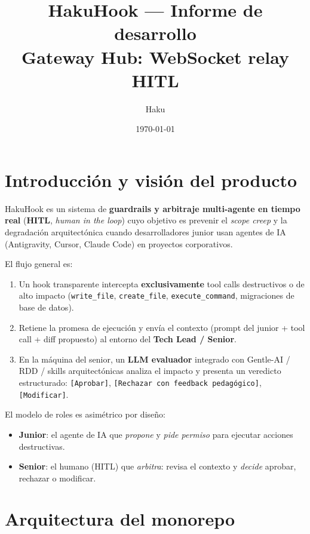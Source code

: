 \documentclass[11pt,a4paper]{article}
\title{\textbf{HakuHook --- Informe de desarrollo}\\ \large Gateway Hub: WebSocket relay HITL}
\author{Haku}
\date{\today}
\begin{document}
\maketitle
\tableofcontents
\newpage

\section{Introducción y visión del producto}

HakuHook es un sistema de \textbf{guardrails y arbitraje multi-agente en tiempo
real} (\textbf{HITL}, \emph{human in the loop}) cuyo objetivo es prevenir el
\emph{scope creep} y la degradación arquitectónica cuando desarrolladores junior
usan agentes de IA (Antigravity, Cursor, Claude Code) en proyectos corporativos.

El flujo general es:

\begin{enumerate}
  \item Un hook transparente intercepta \textbf{exclusivamente} tool calls
        destructivos o de alto impacto (\texttt{write\_file},
        \texttt{create\_file}, \texttt{execute\_command}, migraciones de base de datos).
  \item Retiene la promesa de ejecución y envía el contexto
        (prompt del junior + tool call + diff propuesto) al entorno del
        \textbf{Tech Lead / Senior}.
  \item En la máquina del senior, un \textbf{LLM evaluador} integrado con
        Gentle-AI / RDD / skills arquitectónicas analiza el impacto y presenta
        un veredicto estructurado: \texttt{[Aprobar]},
        \texttt{[Rechazar con feedback pedagógico]}, \texttt{[Modificar]}.
\end{enumerate}

El modelo de roles es asimétrico por diseño:

\begin{itemize}
  \item \textbf{Junior}: el agente de IA que \emph{propone} y \emph{pide permiso}
        para ejecutar acciones destructivas.
  \item \textbf{Senior}: el humano (HITL) que \emph{arbitra}: revisa el contexto
        y \emph{decide} aprobar, rechazar o modificar.
\end{itemize}

\section{Arquitectura del monorepo}
\end{document}
